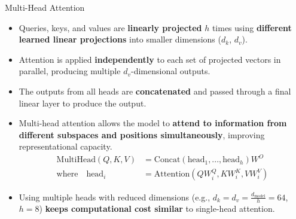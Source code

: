 \documentclass{beamer}
\begin{document}
\begin{frame}{Multi-Head Attention}

\begin{itemize}
  \item Queries, keys, and values are \textbf{linearly projected} $h$ times using \textbf{different learned linear projections} into smaller dimensions ($d_k$, $d_v$).
  
  \item Attention is applied \textbf{independently} to each set of projected vectors in parallel, producing multiple $d_v$-dimensional outputs.
  
  \item The outputs from all heads are \textbf{concatenated} and passed through a final linear layer to produce the output.
  
  \item Multi-head attention allows the model to \textbf{attend to information from different subspaces and positions simultaneously}, improving representational capacity.
  \begin{align*}
    \text{MultiHead}(Q, K, V) &= \text{Concat}(\text{head}_1, ..., \text{head}_h)W^O \\
    \text{where} \quad \text{head}_i &= \text{Attention}(QW^Q_i, KW^K_i, VW^V_i)
  \end{align*}

  \item Using multiple heads with reduced dimensions (e.g., $d_k = d_v = \frac{d_{\text{model}}}{h} = 64$, $h = 8$) \textbf{keeps computational cost similar} to single-head attention.
\end{itemize}
    
\end{frame}
\end{document}

